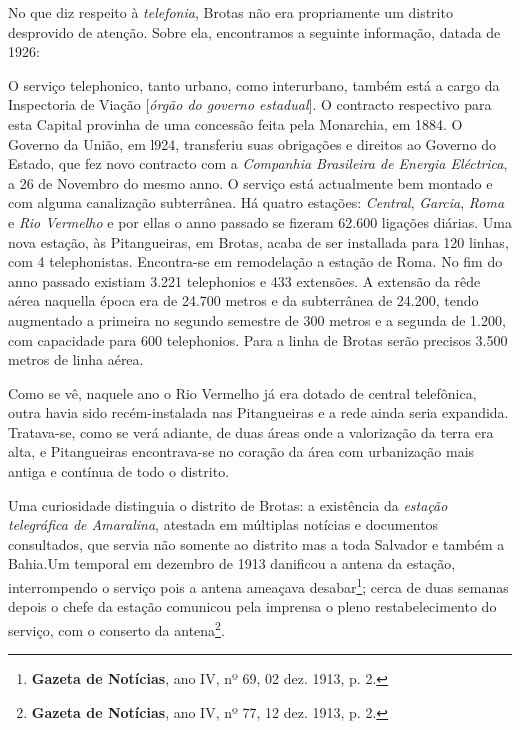 No que diz respeito à \textit{telefonia}, Brotas não era propriamente um distrito desprovido de atenção. Sobre ela, encontramos a seguinte informação, datada de 1926:

\begin{citacao}
O serviço telephonico, tanto urbano, como interurbano, também está a cargo da Inspectoria de Viação [\textit{órgão do governo estadual}].
O contracto respectivo para esta Capital provinha de uma concessão feita pela Monarchia, em 1884.
O Governo da União, em l924, transferiu suas obrigações e direitos ao Governo do Estado, que fez novo contracto com a \textit{Companhia Brasileira de Energia Eléctrica}, a 26 de Novembro do mesmo anno.
O serviço está actualmente bem montado e com alguma canalização subterrânea.
Há quatro estações: \textit{Central}, \textit{Garcia}, \textit{Roma} e \textit{Rio Vermelho} e por ellas o anno passado se fizeram 62.600 ligações diárias.
Uma nova estação, às Pitangueiras, em Brotas, acaba de ser installada para 120 linhas, com 4 telephonistas.
Encontra-se em remodelação a estação de Roma.
No fim do anno passado existiam 3.221 telephonios e 433 extensões.
A extensão da rêde aérea naquella época era de 24.700 metros e da subterrânea de 24.200, tendo augmentado a primeira no segundo semestre de 300 metros e a segunda
de 1.200, com capacidade para 600 telephonios.
Para a linha de Brotas serão precisos 3.500 metros de linha aérea. \cite[pp.~266-267]{bahia_rpe_1926}
\end{citacao}

Como se vê, naquele ano o Rio Vermelho já era dotado de central telefônica, outra havia sido recém-instalada nas Pitangueiras e a rede ainda seria expandida. Tratava-se, como se verá adiante, de duas áreas onde a valorização da terra era alta, e Pitangueiras encontrava-se no coração da área com urbanização mais antiga e contínua de todo o distrito.

Uma curiosidade distinguia o distrito de Brotas: a existência da \textit{estação telegráfica de Amaralina}, atestada em múltiplas notícias e documentos consultados, que servia não somente ao distrito mas a toda Salvador e também a Bahia.Um temporal em dezembro de 1913 danificou a antena da estação, interrompendo o serviço pois a antena ameaçava desabar\footnote{\textbf{Gazeta de Notícias}, ano IV, nº 69, 02 dez. 1913, p. 2.}; cerca de duas semanas depois o chefe da estação comunicou pela imprensa o pleno restabelecimento do serviço, com o conserto da antena\footnote{\textbf{Gazeta de Notícias}, ano IV, nº 77, 12 dez. 1913, p. 2.}.

